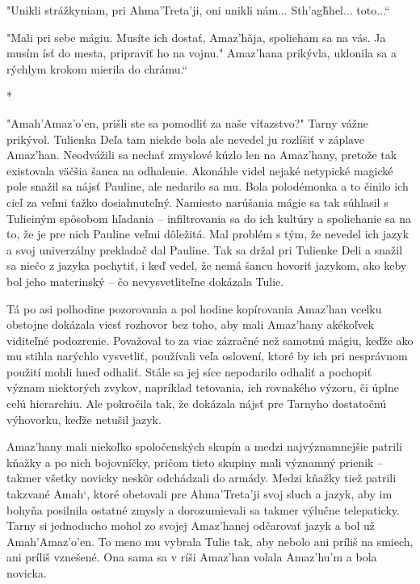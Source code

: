 \documentclass{book}
\begin{document}
"$ $Unikli strážkyniam, pri Ahma'Treta'ji, oni unikli nám... Sth'agh\v{}hel... toto...“

"$ $Mali pri sebe mágiu. Musíte ich dostať, Amaz'ha\v{}ja, spolieham sa na vás. Ja musím ísť do mesta, pripraviť ho na vojnu."$ $ Amaz'hana prikývla, uklonila sa a rýchlym krokom mierila do chrámu.“

\begin{center}
*
\end{center}

"$ $Amah'Amaz'o'en, prišli ste sa pomodliť za naše víťazstvo?"$ $ Tarny vážne prikývol. Tulienka Deľa tam niekde bola ale nevedel ju rozlíšiť v záplave Amaz'han. Neodvážili sa nechať zmyslové kúzlo len na Amaz'hany, pretože tak existovala väčšia šanca na odhalenie. Akonáhle videl nejaké netypické magické pole snažil sa nájsť Pauline, ale nedarilo sa mu. Bola polodémonka a to činilo ich cieľ za veľmi ťažko dosiahnuteľný. Namiesto narúšania mágie sa tak súhlasil s Tulieiným spôsobom hľadania – infiltrovania sa do ich kultúry a spoliehanie sa na to, že je pre nich Pauline veľmi dôležitá. Mal problém s tým, že nevedel ich jazyk a svoj univerzálny prekladač dal Pauline. Tak sa držal pri Tulienke Deli a snažil sa niečo z jazyka pochytiť, i keď vedel, že nemá šancu hovoriť jazykom, ako keby bol jeho materinský – čo nevysvetliteľne dokázala Tulie.

Tá po asi polhodine pozorovania a pol hodine kopírovania Amaz'han vcelku obstojne dokázala viesť rozhovor bez toho, aby mali Amaz'hany akékoľvek viditeľné podozrenie. Považoval to za viac zázračné než samotnú mágiu, keďže ako mu stihla narýchlo vysvetliť, používali veľa oslovení, ktoré by ich pri nesprávnom použití mohli hneď odhaliť. Stále sa jej síce nepodarilo odhaliť a pochopiť význam niektorých zvykov, napríklad tetovania, ich rovnakého výzoru, či úplne celú hierarchiu. Ale pokročila tak, že dokázala nájsť pre Tarnyho dostatočnú výhovorku, keďže netušil jazyk.

Amaz'hany mali niekoľko spoločenských skupín a medzi najvýznamnejšie patrili kňažky a po nich bojovníčky, pričom tieto skupiny mali významný prienik – takmer všetky novicky neskôr odchádzali do armády. Medzi kňažky tiež patrili takzvané Amah‘, ktoré obetovali pre Ahma'Treta'ji svoj sluch a jazyk, aby im bohyňa posilnila ostatné zmysly a dorozumievali sa takmer výlučne telepaticky. Tarny si jednoducho mohol zo svojej Amaz'hanej odčarovať jazyk a bol už Amah'Amaz'o'en. To meno mu vybrala Tulie tak, aby nebolo ani príliš na smiech, ani príliš vznešené. Ona sama sa v ríši Amaz'han volala Amaz'hu'm a bola novicka.
\end{document}
